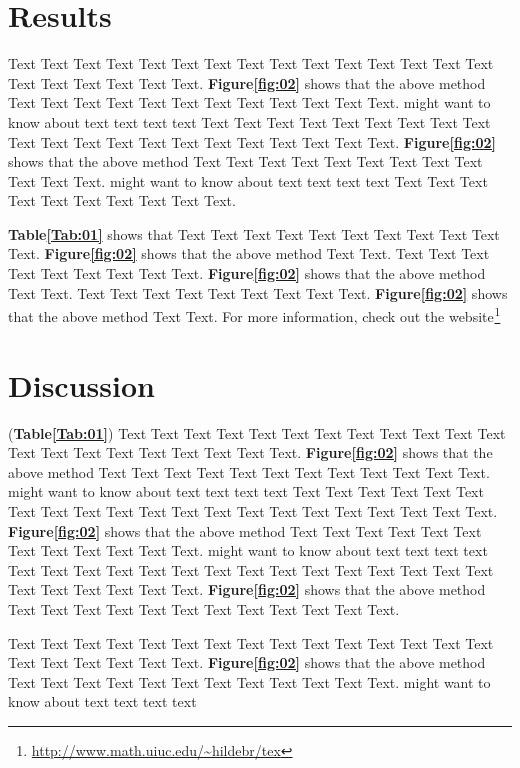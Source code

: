 \documentclass{bioinfo}
\begin{document}
\section{Results}

Text Text Text Text Text Text  Text Text Text Text Text Text Text Text Text  Text Text Text Text Text Text. \textbf{Figure\ref{fig:02}} shows that the above method  Text Text Text Text  Text Text Text Text Text Text  Text Text.  \citealp{Boffelli03} might want to know about  text text text text
Text Text Text Text Text Text  Text Text Text Text Text Text Text Text Text  Text Text Text Text Text Text. \textbf{Figure\ref{fig:02}} shows that the above method  Text Text Text Text  Text Text Text Text Text Text  Text Text.  \citealp{Boffelli03} might want to know about  text text text text
Text Text Text Text Text Text  Text Text Text Text.


\textbf{Table\ref{Tab:01}} shows that Text Text Text Text Text  Text Text Text Text Text Text. \textbf{Figure\ref{fig:02}} shows that
the above method Text Text. Text Text Text  Text Text Text Text Text Text. \textbf{Figure\ref{fig:02}} shows that
the above method Text Text. Text Text Text  Text Text Text Text Text Text. \textbf{Figure\ref{fig:02}} shows that
the above method Text Text. For more information, check out the {website$^{}$}\footnote{\url{http://www.math.uiuc.edu/~hildebr/tex}}


\section{Discussion}

(\textbf{Table\ref{Tab:01}}) Text Text Text Text Text Text  Text Text Text Text Text Text Text Text Text  Text Text Text Text Text Text. \textbf{Figure\ref{fig:02}} shows that the above method  Text Text Text Text  Text Text Text Text Text Text  Text Text.  \citealp{Boffelli03} might want to know about  text text text text
Text Text Text Text Text Text  Text Text Text Text Text Text Text Text Text  Text Text Text Text Text Text. \textbf{Figure\ref{fig:02}} shows that the above method  Text Text Text Text  Text Text Text Text Text Text  Text Text.  \citealp{Boffelli03} might want to know about  text text text text
Text Text Text Text Text Text  Text Text Text Text Text Text Text Text Text  Text Text Text Text Text Text. \textbf{Figure\ref{fig:02}} shows that the above method  Text Text Text Text  Text Text Text Text Text Text  Text Text. 


Text Text Text Text Text Text  Text Text Text Text Text Text Text Text Text  Text Text Text Text Text Text. \textbf{Figure\ref{fig:02}} shows that the above method  Text Text Text Text  Text Text Text Text Text Text  Text Text.  \citealp{Boffelli03} might want to know about  text text text text
\end{document}
